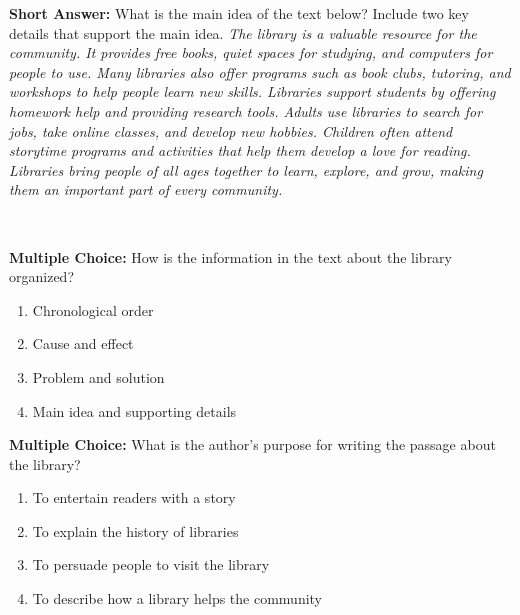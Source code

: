 \documentclass[12pt]{article}
\begin{document}
\begin{tcolorbox}[colframe=black!50, colback=white, title=Question 6]
\textbf{Short Answer:} What is the main idea of the text below? Include two key details that support the main idea.  
\textit{The library is a valuable resource for the community. It provides free books, quiet spaces for studying, and computers for people to use. Many libraries also offer programs such as book clubs, tutoring, and workshops to help people learn new skills. Libraries support students by offering homework help and providing research tools. Adults use libraries to search for jobs, take online classes, and develop new hobbies. Children often attend storytime programs and activities that help them develop a love for reading. Libraries bring people of all ages together to learn, explore, and grow, making them an important part of every community.}

\vspace{2em}
 \underline{\hspace{15.8cm}}  
    \\[0.8cm] \underline{\hspace{15.8cm}}  
\end{tcolorbox}

\begin{tcolorbox}[colframe=black!50, colback=white, title=Question 7]
\textbf{Multiple Choice:} How is the information in the text about the library organized?  
\begin{enumerate}[label=(\Alph*)]
\item Chronological order  
\item Cause and effect  
\item Problem and solution  
\item Main idea and supporting details  
\end{enumerate}
\end{tcolorbox}

\begin{tcolorbox}[colframe=black!50, colback=white, title=Question 8]
\textbf{Multiple Choice:} What is the author’s purpose for writing the passage about the library?  
\begin{enumerate}[label=(\Alph*)]
\item To entertain readers with a story  
\item To explain the history of libraries  
\item To persuade people to visit the library  
\item To describe how a library helps the community  
\end{enumerate}
\end{tcolorbox}
\end{document}
